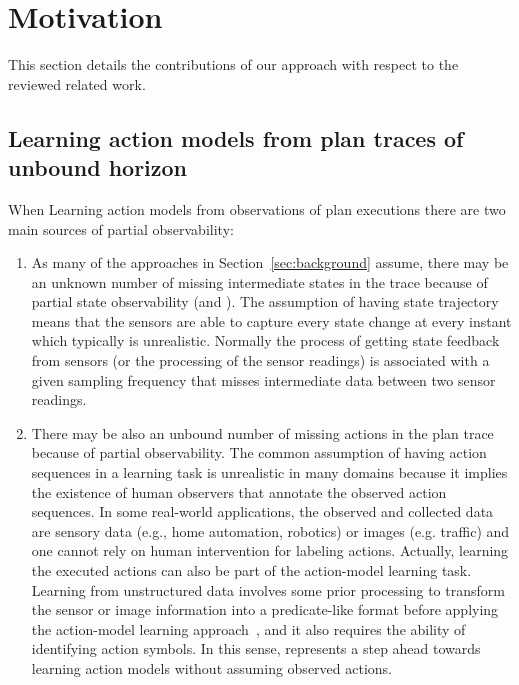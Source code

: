
\section{Motivation}
\label{sec:motivation}
This section details the contributions of our approach with respect to the reviewed related  work.

\subsection{Learning action models from plan traces of unbound horizon}
When Learning action models from observations of plan executions there are two main sources of partial observability:
\begin{enumerate}
\item As many of the approaches in Section~\ref{sec:background} assume, there may be an unknown number of missing intermediate states in the trace because of partial state observability (\PO and \NO). The assumption of having \FO state trajectory means that the sensors are able to capture every state change at every instant which typically is unrealistic. Normally the process of getting state feedback from sensors (or the processing of the sensor readings) is associated with a given sampling frequency that misses intermediate data between two sensor readings.

\item There may be also an unbound number of missing actions in the plan trace because of partial observability. The common assumption of having \FO action sequences in a learning task is unrealistic in many domains because it implies the existence of human observers that annotate the observed action sequences. In some real-world applications, the observed and collected data are sensory data (e.g., home automation, robotics) or images (e.g. traffic) and one cannot rely on human intervention for labeling actions. Actually, learning the executed actions can also be part of the action-model learning task. Learning from unstructured data involves some prior processing to transform the sensor or image information into a predicate-like format before applying the action-model learning approach~\cite{AsaiF18}, and it also requires the ability of identifying action symbols. In this sense, \FAMA represents a step ahead towards learning action models without assuming observed actions.
\end{enumerate}

